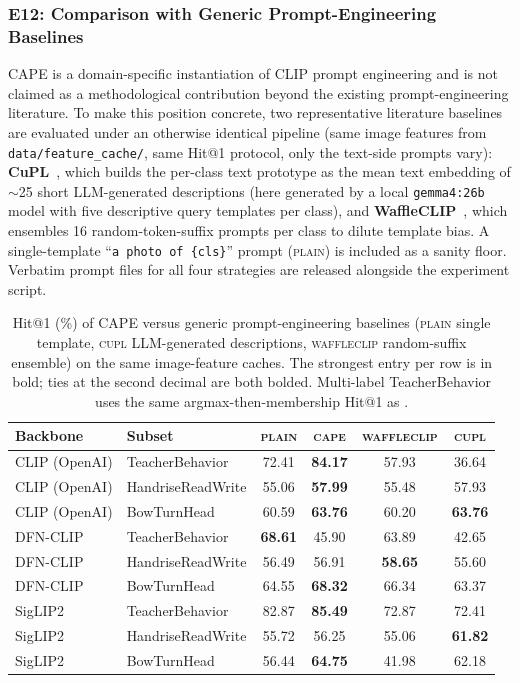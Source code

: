 \documentclass[symmetry,article,submit,pdftex,moreauthors]{Definitions/mdpi}
\begin{document}
\subsubsection{E12: Comparison with Generic Prompt-Engineering Baselines}
\label{sec:e12_prompt_baselines}

CAPE is a domain-specific instantiation of CLIP prompt engineering and is not claimed as a methodological contribution beyond the existing prompt-engineering literature. To make this position concrete, two representative literature baselines are evaluated under an otherwise identical pipeline (same image features from \texttt{data/feature\_cache/}, same Hit@1 protocol, only the text-side prompts vary): \textbf{CuPL}~\cite{pratt2023cupl}, which builds the per-class text prototype as the mean text embedding of $\sim$25 short LLM-generated descriptions (here generated by a local \texttt{gemma4:26b} model with five descriptive query templates per class), and \textbf{WaffleCLIP}~\cite{roth2023waffleclip}, which ensembles 16 random-token-suffix prompts per class to dilute template bias. A single-template ``\texttt{a photo of \{cls\}}'' prompt (\textsc{plain}) is included as a sanity floor. Verbatim prompt files for all four strategies are released alongside the experiment script.

\begin{table}[H]
\caption{Hit@1 (\%) of CAPE versus generic prompt-engineering baselines (\textsc{plain} single template, \textsc{cupl} LLM-generated descriptions, \textsc{waffleclip} random-suffix ensemble) on the same image-feature caches. The strongest entry per row is in bold; ties at the second decimal are both bolded. Multi-label TeacherBehavior uses the same argmax-then-membership Hit@1 as .}
\label{tab:prompt_baselines}
\centering
\small
\setlength{\tabcolsep}{4pt}
\begin{tabular}{l l cccc}
\toprule
\textbf{Backbone} & \textbf{Subset} & \textsc{plain} & \textsc{cape} & \textsc{waffleclip} & \textsc{cupl} \\
\midrule
CLIP (OpenAI) & TeacherBehavior   & 72.41 & \textbf{84.17} & 57.93 & 36.64 \\
CLIP (OpenAI) & HandriseReadWrite & 55.06 & \textbf{57.99} & 55.48 & 57.93 \\
CLIP (OpenAI) & BowTurnHead       & 60.59 & \textbf{63.76} & 60.20 & \textbf{63.76} \\
DFN-CLIP & TeacherBehavior        & \textbf{68.61} & 45.90 & 63.89 & 42.65 \\
DFN-CLIP & HandriseReadWrite      & 56.49 & 56.91 & \textbf{58.65} & 55.60 \\
DFN-CLIP & BowTurnHead            & 64.55 & \textbf{68.32} & 66.34 & 63.37 \\
SigLIP2 & TeacherBehavior         & 82.87 & \textbf{85.49} & 72.87 & 72.41 \\
SigLIP2 & HandriseReadWrite       & 55.72 & 56.25 & 55.06 & \textbf{61.82} \\
SigLIP2 & BowTurnHead             & 56.44 & \textbf{64.75} & 41.98 & 62.18 \\
\bottomrule
\end{tabular}
\end{table}
\end{document}
